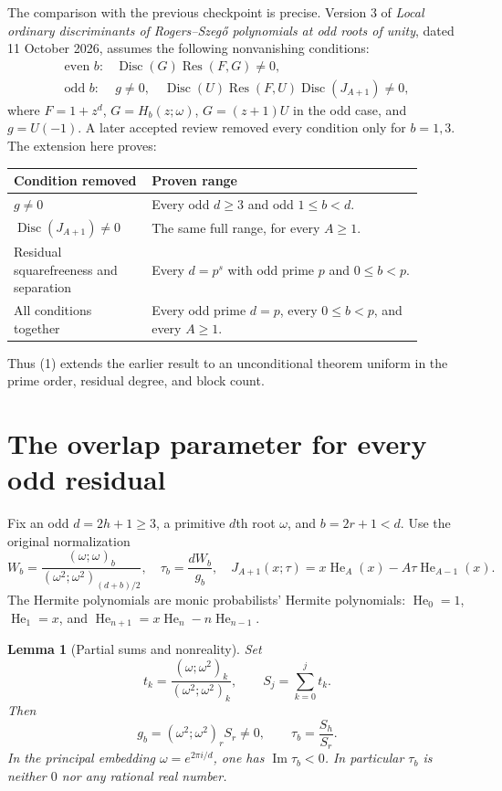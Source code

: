 \documentclass[11pt]{article}
\newtheorem{lemma}[theorem]{Lemma}
\theoremstyle{remark}\newtheorem{remark}[theorem]{Remark}
\newcommand{\He}{\operatorname{He}}
\newcommand{\Disc}{\operatorname{Disc}}
\newcommand{\Res}{\operatorname{Res}}
\newcommand{\poch}[3]{(#1;#2)_{#3}}
\begin{document}
The comparison with the previous checkpoint is precise. Version 3 of
\emph{Local ordinary discriminants of Rogers--Szeg\H{o} polynomials at
odd roots of unity}, dated 11 October 2026, assumes the following
nonvanishing conditions:
\[
\begin{array}{ll}
\text{even }b:&\Disc(G)\Res(F,G)\ne0,\\
\text{odd }b:&g\ne0,\quad
\Disc(U)\Res(F,U)\Disc(J_{A+1})\ne0,
\end{array}
\tag{3}
\]
where $F=1+z^d$, $G=H_b(z;\omega)$, $G=(z+1)U$ in the odd case,
and $g=U(-1)$. A later accepted review removed every condition only
for $b=1,3$. The extension here proves:

\begin{center}
\begin{tabular}{>{\raggedright\arraybackslash}p{0.30\linewidth}>{\raggedright\arraybackslash}p{0.59\linewidth}}
\toprule
Condition removed & Proven range\\
\midrule
$g\ne0$ & Every odd $d\geq3$ and odd $1\leq b<d$.\\
$\Disc(J_{A+1})\ne0$ & The same full range, for every $A\geq1$.\\
Residual squarefreeness and separation & Every $d=p^s$ with
odd prime $p$ and $0\leq b<p$.\\
All conditions together & Every odd prime $d=p$, every
$0\leq b<p$, and every $A\geq1$.\\
\bottomrule
\end{tabular}
\end{center}

Thus (1) extends the earlier result to an unconditional theorem
uniform in the prime order, residual degree, and block count.

\section{The overlap parameter for every odd residual}

Fix an odd $d=2h+1\geq3$, a primitive $d$th root $\omega$, and
$b=2r+1<d$. Use the original normalization
\[
W_b=\frac{\poch{\omega}{\omega}{b}}
              {\poch{\omega^2}{\omega^2}{(d+b)/2}},
\quad
\tau_b=\frac{dW_b}{g_b},
\quad
J_{A+1}(x;\tau)
=x\He_A(x)-A\tau\He_{A-1}(x).
\tag{4}
\]
The Hermite polynomials are monic probabilists' Hermite polynomials:
$\He_0=1$, $\He_1=x$, and
$\He_{n+1}=x\He_n-n\He_{n-1}$.

\begin{lemma}[Partial sums and nonreality]\label{lem:partial}
Set
\[
t_k=\frac{\poch{\omega}{\omega^2}{k}}
           {\poch{\omega^2}{\omega^2}{k}},
\qquad S_j=\sum_{k=0}^j t_k.
\]
Then
\[
g_b=\poch{\omega^2}{\omega^2}{r}S_r\ne0,
\qquad
\boxed{\tau_b=\frac{S_h}{S_r}.}
\tag{5}
\]
In the principal embedding $\omega=e^{2\pi i/d}$, one has
$\operatorname{Im}\tau_b<0$. In particular $\tau_b$ is neither
$0$ nor any rational real number.
\end{lemma}
\end{document}

